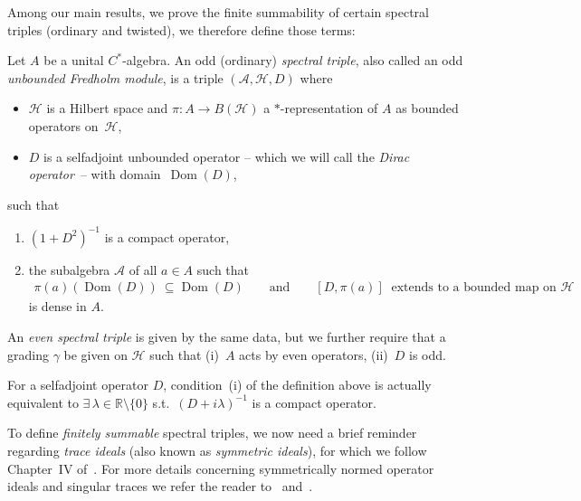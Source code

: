 \documentclass[11pt]{article}
\newcommand{\Aa}{\mathcal{A}}
\newcommand{\Hh}{\mathscr{H}}
\newcommand{\R}{\mathbb{R}}
\DeclareMathOperator{\dom}{Dom}
\numberwithin{equation}{section}
\begin{document}
Among our main results, we prove the f\/inite summability of certain spectral triples (ordinary and twisted), we therefore def\/ine those terms:
\begin{Definition}
\label{Def:TrSp}
Let $A$ be a unital $C^*$-algebra. An odd (ordinary) \emph{spectral triple}, also called an odd \emph{unbounded Fredholm module}, is a triple $(\Aa, \Hh, D)$ where
\begin{itemize}\itemsep=0pt
\item
$\Hh$ is a Hilbert space and $\pi \colon A\to B(\Hh)$ a $*$-representation of $A$ as bounded operators on~$\Hh$,
\item
$D$ is a selfadjoint unbounded operator -- which we will call the \emph{Dirac operator}~-- with domain~$\dom(D)$,
\end{itemize}
such that
\begin{enumerate}\itemsep=0pt
\item[(i)]
$(1+D^2)^{-1}$ is a compact operator,
\item[(ii)]
the subalgebra $\Aa$ of all $a\in A$ such that
\begin{gather*}
\pi(a) (\dom(D)) \ \subseteq \dom(D)
\qquad
 \text{and}
\qquad
[D,\pi(a)] \ \text{ extends to a bounded map on }\Hh
\end{gather*}
is dense in $A$.
\end{enumerate}
An \emph{even spectral triple} is given by the same data, but we further require that a grading $\gamma$ be given on $\Hh$ such that (i)~$A$ acts by even operators, (ii)~$D$ is odd.
\end{Definition}

\begin{Remark}
\label{Rk:SymmIdeals}
For a selfadjoint operator $D$, condition~(i) %
of the def\/inition above is actually equivalent to $\exists\, \lambda \in \R {\setminus} \{ 0 \}$ s.t.\ $(D+i \lambda)^{-1}$ is a compact operator.
\end{Remark}

To def\/ine \emph{finitely summable} spectral triples, we now need a brief reminder regarding \emph{trace ideals} (also known as \emph{symmetric ideals}), for which we follow Chapter~IV of~\cite{NCG}.
For more details concerning symmetrically normed operator ideals and singular traces we refer the reader to~\cite{TraceIdealsSimon} and~\cite{SingularTracesLSZ}.
\end{document}

